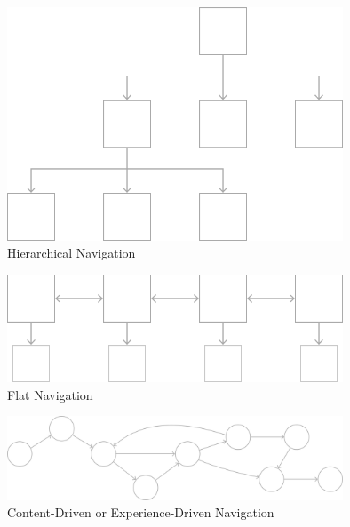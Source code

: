 \begin{figure}[htbp]
  \begin{minipage}{\hsize}
    \begin{center}
       \includegraphics[width=100mm]{img/hig_hierarchical.png}
    \end{center}
    \caption{Hierarchical Navigation\cite{hignavigation}}
    \label{fig:hig_hierarchical}
  \end{minipage}
\end{figure}

\begin{figure}[htbp]
  \begin{minipage}{\hsize}
    \begin{center}
       \includegraphics[width=100mm]{img/hig_flat.png}
    \end{center}
    \caption{Flat Navigation\cite{hignavigation}}
    \label{fig:hig_flat}
  \end{minipage}
\end{figure}

\begin{figure}[htbp]
  \begin{minipage}{\hsize}
    \begin{center}
       \includegraphics[width=100mm]{img/hig_ExperienceDriven.png}
    \end{center}
    \caption{Content-Driven or Experience-Driven Navigation\cite{hignavigation}}
    \label{fig:hig_experiencedriven}
  \end{minipage}
\end{figure}



